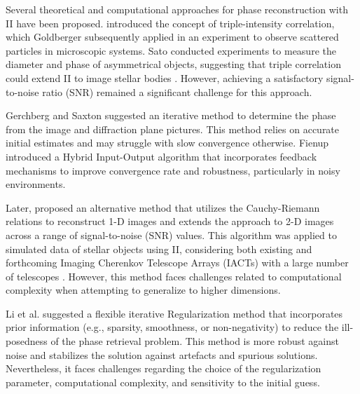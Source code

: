 Several theoretical and computational approaches for phase reconstruction with II have been proposed. \cite{gamo1963triple} introduced the concept of triple-intensity correlation, which Goldberger subsequently applied \cite{goldberger1963use} in an experiment to observe scattered particles in microscopic systems. Sato conducted experiments to measure the diameter and phase of asymmetrical objects, suggesting that triple correlation could extend II to image stellar bodies \citep{sato1978imaging, sato1979computer, sato1981adaptive}. However, achieving a satisfactory signal-to-noise ratio (SNR) remained a significant challenge for this approach.

Gerchberg and Saxton suggested an iterative method \citep{GerchbergSaxton1972} to determine the phase from the image and diffraction plane pictures. This method relies on accurate initial estimates and may struggle with slow convergence otherwise. Fienup \citep{Fienup1982} introduced a Hybrid Input-Output algorithm that incorporates feedback mechanisms to improve convergence rate and robustness, particularly in noisy environments.

Later, \cite{holmes2010two} proposed an alternative method that utilizes the Cauchy-Riemann relations to reconstruct 1-D images and extends the approach to 2-D images across a range of signal-to-noise (SNR) values. This algorithm was applied to simulated data of stellar objects using II, considering both existing and forthcoming Imaging Cherenkov Telescope Arrays (IACTs) with a large number of telescopes \citep{nunez2010stellar, nunez2012high, nunez2012imaging}. However, this method faces challenges related to computational complexity when attempting to generalize to higher dimensions.

Li et al. suggested a flexible iterative Regularization method \citep{Li2014} that incorporates prior information (e.g., sparsity, smoothness, or non-negativity) to reduce the ill-posedness of the phase retrieval problem. This method is more robust against noise and stabilizes the solution against artefacts and spurious solutions. Nevertheless, it faces challenges regarding the choice of the regularization parameter, computational complexity, and sensitivity to the initial guess.

